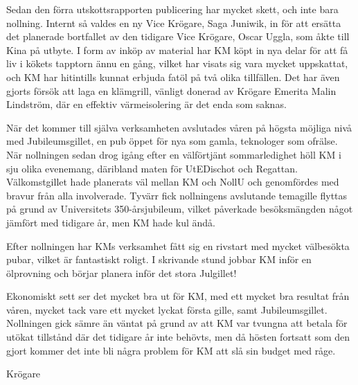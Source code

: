 \documentclass[../_main/handlingar.tex]{subfiles}
\begin{document}
Sedan den förra utskottsrapporten publicering har mycket skett, och inte bara nollning. Internt så valdes en ny Vice Krögare, Saga Juniwik, in för att ersätta det planerade bortfallet av den tidigare Vice Krögare, Oscar Uggla, som åkte till Kina på utbyte. I form av inköp av material har KM köpt in nya delar för att få liv i kökets tapptorn ännu en gång, vilket har visats sig vara mycket uppskattat, och KM har hitintills kunnat erbjuda fatöl på två olika tillfällen. Det har även gjorts försök att laga en klämgrill, vänligt donerad av Krögare Emerita Malin Lindström, där en effektiv värmeisolering är det enda som saknas.

När det kommer till själva verksamheten avslutades våren på högsta möjliga nivå med Jubileumsgillet, en pub öppet för nya som gamla, teknologer som ofrälse. När nollningen sedan drog igång efter en välförtjänt sommarledighet höll KM i sju olika evenemang, däribland maten för UtEDischot och Regattan. Välkomstgillet hade planerats väl mellan KM och NollU och genomfördes med bravur från alla involverade. Tyvärr fick nollningens avslutande temagille flyttas på grund av Universitets 350-årsjubileum, vilket påverkade besöksmängden något jämfört med tidigare år, men KM hade kul ändå.

Efter nollningen har KMs verksamhet fått sig en rivstart med mycket välbesökta pubar, vilket är fantastiskt roligt. I skrivande stund jobbar KM inför en ölprovning och börjar planera inför det stora Julgillet!

Ekonomiskt sett ser det mycket bra ut för KM, med ett mycket bra resultat från våren, mycket tack vare ett mycket lyckat första gille, samt Jubileumsgillet. Nollningen gick sämre än väntat på grund av att KM var tvungna att betala för utökat tillstånd där det tidigare år inte behövts, men då hösten fortsatt som den gjort kommer det inte bli några problem för KM att slå sin budget med råge.

\begin{signatures}{1}
    \mvh
    \signature{Markus Rahne}{Krögare}
\end{signatures}
\end{document}
